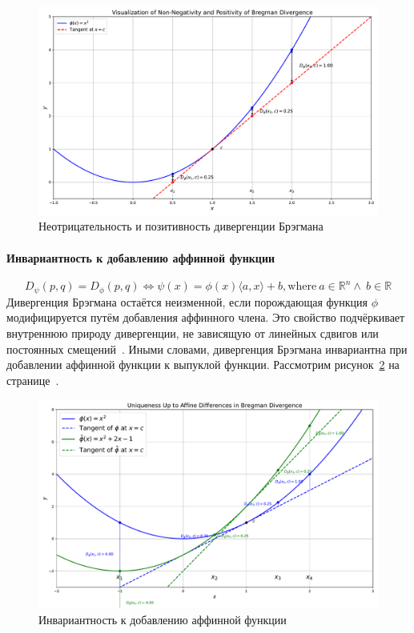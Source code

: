 \documentclass[12pt]{scrartcl}
\begin{document}
\begin{figure}[h]
    \centering
    \includegraphics[width=\textwidth]{non-neg.pdf} %
    \caption{Неотрицательность и позитивность дивергенции Брэгмана}
    \label{fig:non-neg}
\end{figure}

\paragraph{Инвариантность к добавлению аффинной функции}\label{par:affine_difference}
\begin{equation}
    D_\psi (p,q) = D_\phi(p,q) \Longleftrightarrow \psi(x) = \phi (x) \langle a, x \rangle + b, \text{where}\ a \in \mathbb{R}^n \wedge \ b \in \mathbb{R}
\end{equation}
Дивергенция Брэгмана остаётся неизменной, если порождающая функция $\phi$ модифицируется путём добавления аффинного члена. Это свойство подчёркивает внутреннюю природу дивергенции, не зависящую от линейных сдвигов или постоянных смещений~\cite{Harremoes2017}. Иными словами, дивергенция Брэгмана инвариантна при добавлении аффинной функции к выпуклой функции. Рассмотрим рисунок~\ref{fig:affinity} на странице~\pageref{fig:affinity}.


\begin{figure}[h]
    \centering
    \includegraphics[width=\textwidth]{affinnity.pdf} %
    \caption{Инвариантность к добавлению аффинной функции}
    \label{fig:affinity}
\end{figure}
\end{document}
